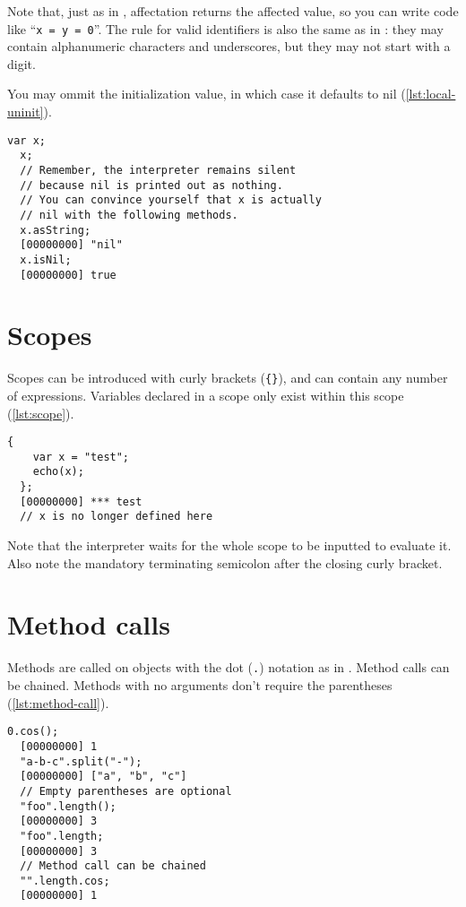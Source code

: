 \documentclass[openright,twoside,12pt]{report}
\begin{document}
Note that, just as in \Cxx, affectation returns the affected value, so
you can write code like ``\lstinline|x = y = 0|''. The rule for valid
identifiers is also the same as in \Cxx: they may contain alphanumeric
characters and underscores, but they may not start with a digit.

You may ommit the initialization value, in which case it defaults to
nil (\autoref{lst:local-uninit}).

\begin{lstlisting}[caption=Variables initialization defaults to
  nil,label=lst:local-uninit]
  var x;
  x;
  // Remember, the interpreter remains silent
  // because nil is printed out as nothing.
  // You can convince yourself that x is actually
  // nil with the following methods.
  x.asString;
  [00000000] "nil"
  x.isNil;
  [00000000] true
\end{lstlisting}

\section{Scopes}

Scopes can be introduced with curly brackets (\texttt{\{\}}), and can
contain any number of expressions. Variables declared in a scope only
exist within this scope (\autoref{lst:scope}).

\begin{lstlisting}[caption=Scoping a variable,label=lst:scope]
  {
    var x = "test";
    echo(x);
  };
  [00000000] *** test
  // x is no longer defined here
\end{lstlisting}

Note that the interpreter waits for the whole scope to be inputted to
evaluate it. Also note the mandatory terminating semicolon after the
closing curly bracket.

\section{Method calls}

Methods are called on objects with the dot (\texttt{.}) notation as in
\Cxx. Method calls can be chained. Methods with no arguments don't
require the parentheses (\autoref{lst:method-call}).

\begin{lstlisting}[caption=Calling methods,label=lst:method-call]
  0.cos();
  [00000000] 1
  "a-b-c".split("-");
  [00000000] ["a", "b", "c"]
  // Empty parentheses are optional
  "foo".length();
  [00000000] 3
  "foo".length;
  [00000000] 3
  // Method call can be chained
  "".length.cos;
  [00000000] 1
\end{lstlisting}
\end{document}
